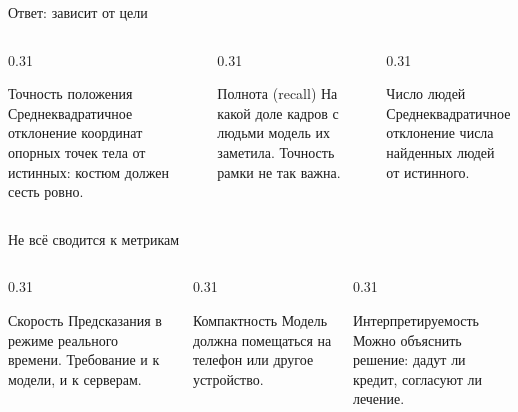 \begin{frame}[c]{Ответ: зависит от цели}
  \begin{columns}[T]
    \begin{column}{0.31\textwidth}
      \begin{block}{Точность положения}
        Среднеквадратичное отклонение координат опорных точек тела от истинных: костюм должен сесть ровно.
      \end{block}
    \end{column}
    \begin{column}{0.31\textwidth}
      \begin{block}{Полнота (recall)}
        На какой доле кадров с людьми модель их заметила. Точность рамки не так важна.
      \end{block}
    \end{column}
    \begin{column}{0.31\textwidth}
      \begin{block}{Число людей}
        Среднеквадратичное отклонение числа найденных людей от истинного.
      \end{block}
    \end{column}
  \end{columns}
\end{frame}

\begin{frame}[c]{Не всё сводится к метрикам}
  \begin{columns}[T]
    \begin{column}{0.31\textwidth}
      \begin{block}{Скорость}
        Предсказания в режиме реального времени. Требование и к модели, и к серверам.
      \end{block}
    \end{column}
    \begin{column}{0.31\textwidth}
      \begin{block}{Компактность}
        Модель должна помещаться на телефон или другое устройство.
      \end{block}
    \end{column}
    \begin{column}{0.31\textwidth}
      \begin{block}{Интерпретируемость}
        Можно объяснить решение: дадут ли кредит, согласуют ли лечение.
      \end{block}
    \end{column}
  \end{columns}
\end{frame}
